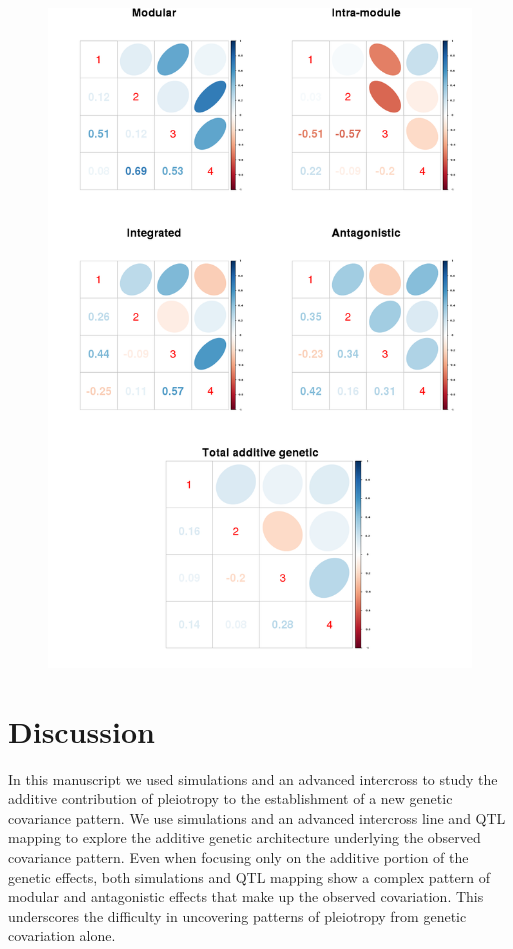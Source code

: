 \begin{refsection}
\begin{figure}
    \centering
    \includegraphics[width=\linewidth]{chapter_atchley/media/additive_matrices_by_class.png}
    \caption[Covariance matrices by effect class]{}
    \label{additive_effects_matrices}
\end{figure}


\section{Discussion}

In this manuscript we used simulations and an advanced intercross to study the
additive contribution of pleiotropy to the establishment of a new genetic
covariance pattern. We use simulations and an advanced intercross line and QTL
mapping to explore the additive genetic architecture underlying the observed
covariance pattern. Even when focusing only on the additive portion of the
genetic effects, both simulations and QTL mapping show a complex pattern of
modular and antagonistic effects that make up the observed covariation. This
underscores the difficulty in uncovering patterns of pleiotropy from genetic
covariation alone.


\end{refsection}

